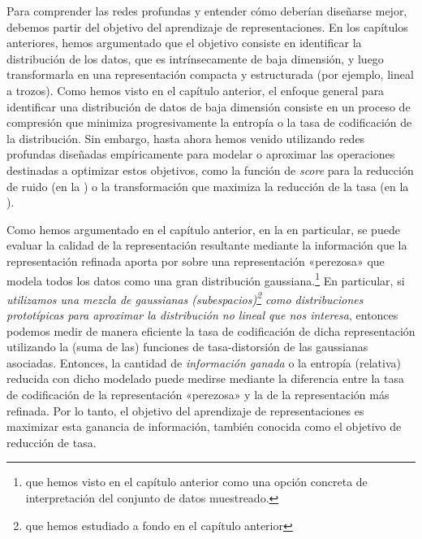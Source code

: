 \documentclass[../../book-main.tex]{subfiles}
\begin{document}
Para comprender las redes profundas y entender cómo deberían diseñarse mejor,
debemos partir del objetivo del aprendizaje de representaciones. En
los capítulos anteriores, hemos argumentado que el objetivo consiste en identificar
la distribución de los datos, que es intrínsecamente de baja dimensión, y luego
transformarla en una representación compacta y estructurada (por ejemplo, lineal a trozos).
Como hemos visto en el capítulo anterior, el enfoque general
para identificar una distribución de datos de baja dimensión consiste
en un proceso de compresión que minimiza progresivamente la
entropía o la tasa de codificación de la distribución. Sin embargo, hasta ahora
hemos venido utilizando redes profundas diseñadas empíricamente para modelar
o aproximar las operaciones destinadas a optimizar estos objetivos,
como la función de \textit{score} para la reducción de ruido (en
la ) o la transformación que maximiza la
reducción de la tasa (en la ).

Como hemos argumentado en el capítulo anterior,
en la  en particular, se
puede evaluar la calidad de la representación resultante mediante la
información que la representación refinada aporta por sobre una representación «perezosa»
que modela todos los datos como una gran
distribución gaussiana.\footnote{que hemos visto en el capítulo anterior como una
opción concreta de interpretación del conjunto de datos muestreado.} En
particular, si \textit{utilizamos una mezcla de gaussianas
    (subespacios)\footnote{que hemos estudiado a fondo en el capítulo
    anterior} como distribuciones prototípicas para aproximar la distribución no lineal
que nos interesa}, entonces podemos medir de manera eficiente la tasa de codificación
de dicha representación utilizando la (suma de las) funciones de tasa-distorsión
de las gaussianas asociadas. Entonces, la cantidad de {\em
información ganada} o la entropía (relativa) reducida con dicho
modelado puede medirse mediante la diferencia entre la tasa de codificación
de la representación «perezosa» y la de la representación más refinada.
Por lo tanto, el objetivo del aprendizaje de representaciones es
maximizar esta ganancia de información, también conocida como el objetivo de reducción de tasa.
\end{document}
